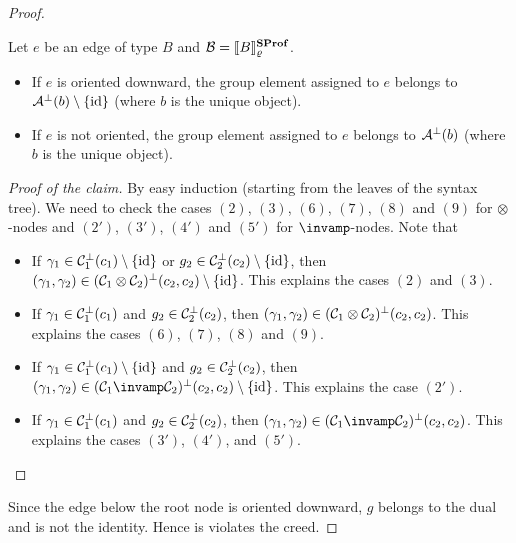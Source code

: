 \begin{proof}
    \begin{claim*}
        Let \( e \) be an edge of type \( B \) and \( \mathcal{B} = \llbracket{B}\rrbracket_{\varrho}^{\mathbf{SProf}} \).
        \begin{itemize}
            \item If \( e \) is oriented downward, the group element assigned to \( e \) belongs to \( \mathcal{A}^\bot(b)\setminus\{\mathrm{id}\} \) (where \( b \) is the unique object).
            \item If \( e \) is not oriented, the group element assigned to \( e \) belongs to \( \mathcal{A}^\bot(b) \) (where \( b \) is the unique object).
        \end{itemize}
    \end{claim*}
    \begin{proof}[Proof of the claim]\renewcommand{\qedsymbol}{$\blacksquare$}
        By easy induction (starting from the leaves of the syntax tree).
        We need to check the cases \( (2) \), \( (3) \), \( (6) \), \( (7) \), \( (8) \) and \( (9) \) for \( \otimes \)-nodes and \( (2') \), \( (3') \), \( (4') \) and \( (5') \) for \( \llpar \)-nodes.
        Note that
        \begin{itemize}
            \item
                If \( \gamma_1 \in \mathcal{C}_1^{\bot}(c_1)\setminus\{\mathrm{id}\} \) or \( g_2 \in \mathcal{C}_2^{\bot}(c_2)\setminus\{\mathrm{id}\} \), then \( (\gamma_1, \gamma_2) \in (\mathcal{C}_1 \otimes \mathcal{C}_2)^{\bot}(c_2, c_2)\setminus\{\mathrm{id}\} \).
                This explains the cases \( (2) \) and \( (3) \).
            \item
                If \( \gamma_1 \in \mathcal{C}_1^{\bot}(c_1) \) and \( g_2 \in \mathcal{C}_2^{\bot}(c_2) \), then \( (\gamma_1, \gamma_2) \in (\mathcal{C}_1 \otimes \mathcal{C}_2)^{\bot}(c_2, c_2) \).
                This explains the cases \( (6) \), \( (7) \), \( (8) \) and \( (9) \).
            \item
                If \( \gamma_1 \in \mathcal{C}_1^{\bot}(c_1)\setminus\{\mathrm{id}\} \) and \( g_2 \in \mathcal{C}_2^{\bot}(c_2) \), then \( (\gamma_1, \gamma_2) \in (\creedc_1 \llpar \creedc_2)^{\bot}(c_2, c_2)\setminus\{\ident\} \).
                This explains the case \( (2') \).
            \item
                If \( \gamma_1 \in \mathcal{C}_1^{\bot}(c_1) \) and \( g_2 \in \mathcal{C}_2^{\bot}(c_2) \), then \( (\gamma_1, \gamma_2) \in (\creedc_1 \llpar \creedc_2)^{\bot}(c_2, c_2) \).
                This explains the cases \( (3') \), \( (4') \), and \( (5') \).
                \qedhere
        \end{itemize}
    \end{proof}

    Since the edge below the root node is oriented downward, \( g \) belongs to the dual and is not the identity.
    Hence is violates the creed. 
\end{proof}



